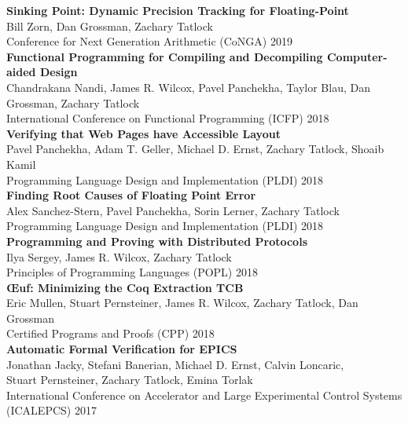 \documentclass[10pt]{article}
\begin{document}
\textbf{%
Sinking Point: Dynamic Precision Tracking for Floating-Point
} \\
Bill Zorn, Dan Grossman, Zachary Tatlock \\
Conference for Next Generation Arithmetic (CoNGA) 2019 \\

\textbf{%
Functional Programming for Compiling and Decompiling Computer-aided Design
} \\
Chandrakana Nandi, James R. Wilcox, Pavel Panchekha, Taylor Blau, Dan Grossman, Zachary Tatlock \\
International Conference on Functional Programming (ICFP) 2018 \\

\textbf{%
Verifying that Web Pages have Accessible Layout
} \\
Pavel Panchekha, Adam T. Geller, Michael D. Ernst, Zachary Tatlock, Shoaib Kamil \\
Programming Language Design and Implementation (PLDI) 2018 \\

\textbf{%
Finding Root Causes of Floating Point Error
} \\
Alex Sanchez-Stern, Pavel Panchekha, Sorin Lerner, Zachary Tatlock \\
Programming Language Design and Implementation (PLDI) 2018 \\

\textbf{%
Programming and Proving with Distributed Protocols
} \\
Ilya Sergey, James R. Wilcox, Zachary Tatlock \\
Principles of Programming Languages (POPL) 2018 \\

\textbf{%
Œuf: Minimizing the Coq Extraction TCB
} \\
Eric Mullen, Stuart Pernsteiner, James R. Wilcox, Zachary Tatlock, Dan Grossman \\
Certified Programs and Proofs (CPP) 2018 \\

\textbf{%
Automatic Formal Verification for EPICS
} \\
Jonathan Jacky, Stefani Banerian, Michael D. Ernst, Calvin Loncaric, \\
Stuart Pernsteiner, Zachary Tatlock, Emina Torlak \\
International Conference on Accelerator and Large Experimental Control Systems (ICALEPCS) 2017 \\
\end{document}
